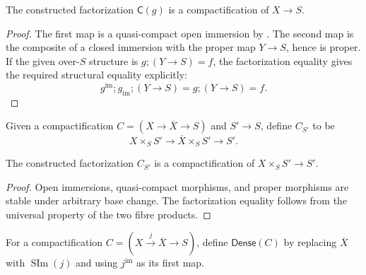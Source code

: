 \begin{lemma}
  \label{lemma:nagata-immersion-into-proper}
  \leanok

  The constructed factorization $\mathsf C(g)$ is a compactification of
  $X\to S$.
\end{lemma}

\begin{proof}
  \leanok
  The first map is a quasi-compact open immersion by
  .  The second map is the
  composite of a closed immersion with the proper map $Y\to S$, hence is
  proper.  If the given over-$S$ structure is
  $g;(Y\to S)=f$, the factorization equality gives the required structural
  equality explicitly:
  \[
    g^{\mathrm{im}};g_{\mathrm{im}};(Y\to S)
      =g;(Y\to S)=f.
  \]
\end{proof}

\begin{definition}
  \label{def:nagata-compactification-base-change}
  \leanok

  Given a compactification $C=(X\to\overline X\to S)$ and $S'\to S$, define
  $C_{S'}$ to be
  \[
    X\times_SS'\longrightarrow\overline X\times_SS'\longrightarrow S'.
  \]
\end{definition}

\begin{lemma}
  \label{lemma:nagata-compactification-base-change}
  \leanok

  The constructed factorization $C_{S'}$ is a compactification of
  $X\times_SS'\to S'$.
\end{lemma}

\begin{proof}
  \leanok
  Open immersions, quasi-compact morphisms, and proper morphisms are stable
  under arbitrary base change.  The factorization equality follows from the
  universal property of the two fibre products.
\end{proof}

\begin{definition}
  \label{def:nagata-dense-refinement}
  \leanok

  For a compactification $C=(X\xrightarrow{j}\overline X\to S)$, define
  $\mathsf{Dense}(C)$ by replacing $\overline X$ with
  $\operatorname{SIm}(j)$ and using $j^{\mathrm{im}}$ as its first map.
\end{definition}

